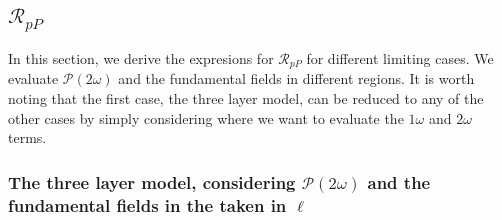 \subsection{\texorpdfstring{$\mathcal{R}_{pP}$}{RpP}}

In this section, we derive the expresions for $\mathcal{R}_{pP}$ for different
limiting cases. We evaluate $\mathcal{P}(2\omega)$ and the fundamental fields in
different regions. It is worth noting that the first case, the three layer
model, can be reduced to any of the other cases by simply considering where we
want to evaluate the $1\omega$ and $2\omega$ terms.


\subsubsection{The three layer model, considering
\texorpdfstring{$\mathcal{P}(2\omega)$}{P(2w)} and the fundamental fields in the
taken in \texorpdfstring{$\ell$}{l}}

